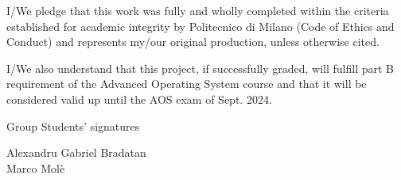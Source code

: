 \documentclass[10pt,a4]{article}
\begin{document}
I/We pledge that this work was fully and wholly completed within the criteria
established for academic integrity by Politecnico di Milano (Code of Ethics and
Conduct) and represents my/our original production, unless otherwise cited.

I/We also understand that this project, if successfully graded,  will fulfill part B requirement of the
Advanced Operating System course and that it will be considered valid up until
the AOS exam of Sept. 2024.

\begin{flushright}
Group Students' signatures

{\LARGE\normalfont\rmfamily Alexandru Gabriel Bradatan}\\
{\LARGE\normalfont\rmfamily Marco Molè}
\end{flushright}
\end{document}
